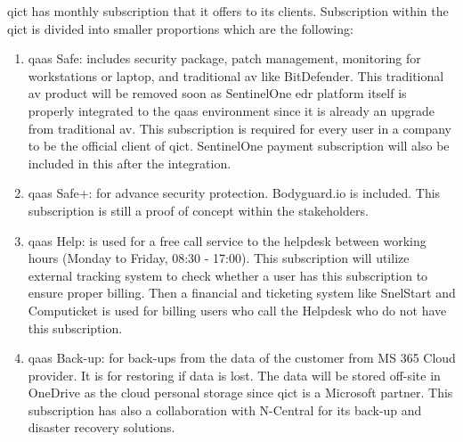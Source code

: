 \acrshort{qict} has monthly subscription that it offers to its clients. Subscription within the \acrshort{qict} is divided into smaller
proportions which are the following:
\begin{enumerate}
      \item \acrshort{qaas} Safe: includes security package, patch management, monitoring for workstations or laptop, and traditional
            \acrshort{av} like BitDefender. This traditional \acrshort{av} product will be removed soon as SentinelOne \acrshort{edr} platform
            itself is properly integrated to the \acrshort{qaas} environment since it is already an upgrade from traditional \acrshort{av}. This
            subscription is required for every user in a company to be the official client of \acrshort{qict}. SentinelOne payment subscription
            will also be included in this after the integration.
      \item \acrshort{qaas} Safe+: for advance security protection. Bodyguard.io is included. This subscription is still a proof of concept
            within the stakeholders.
      \item \acrshort{qaas} Help: is used for a free call service to the helpdesk between working hours (Monday to Friday, 08:30 - 17:00).
            This subscription will utilize external tracking system to check whether a user has this subscription to ensure proper billing.
            Then a financial and ticketing system like SnelStart and Computicket is used for billing users who call the Helpdesk who do
            not have this subscription.
      \item \acrshort{qaas} Back-up: for back-ups from the data of the customer from MS 365 Cloud provider. It is for restoring if data is
            lost. The data will be stored off-site in OneDrive as the cloud personal storage since \acrshort{qict} is a Microsoft partner.
            This subscription has also a collaboration with N-Central for its back-up and disaster recovery solutions.
\end{enumerate}






